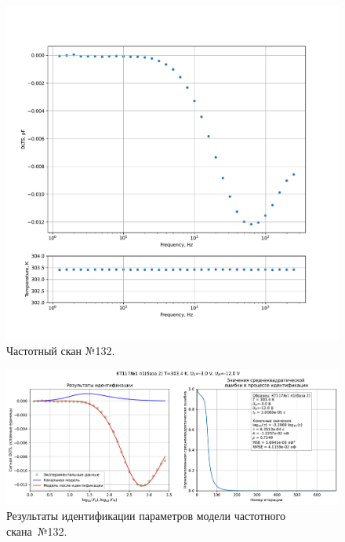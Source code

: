 \begin{figure}[!ht]
    \centering
    \includegraphics[width=1\textwidth]{../plots/КТ117№1_п1(база 2)_2500Гц-1Гц_1пФ_+30С_-3В-12В_200мВ_20мкс_шаг_0,1.pdf}
    \caption{Частотный скан №132.}
    \label{pic:frequency_scan_132}
\end{figure}

\begin{figure}[!ht]
    \centering
    \includegraphics[width=1\textwidth]{../plots/КТ117№1_п1(база 2)_2500Гц-1Гц_1пФ_+30С_-3В-12В_200мВ_20мкс_шаг_0,1_model.pdf}
    \caption{Результаты идентификации параметров модели частотного скана~№132.}
    \label{pic:frequency_scan_model132}
\end{figure}

\pagebreak



